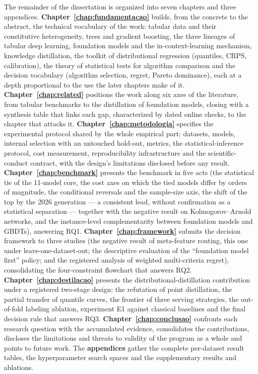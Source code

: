 The remainder of the dissertation is organized into seven chapters
and three appendices. \textbf{Chapter~\ref{chap:fundamentacao}}
builds, from the concrete to the abstract, the technical vocabulary
of the work: tabular data and their constitutive heterogeneity,
trees and gradient boosting, the three lineages of tabular deep
learning, foundation models and the in-context-learning mechanism,
knowledge distillation, the toolkit of distributional regression
(quantiles, CRPS, calibration), the theory of statistical tests for
algorithm comparison and the decision vocabulary (algorithm
selection, regret, Pareto dominance), each at a depth proportional
to the use the later chapters make of it.
\textbf{Chapter~\ref{chap:related}} positions the work along six
axes of the literature, from tabular benchmarks to the distillation
of foundation models, closing with a synthesis table that links each
gap, characterized by dated online checks, to the chapter that
attacks it. \textbf{Chapter~\ref{chap:metodologia}} specifies the
experimental protocol shared by the whole empirical part: datasets,
models, internal selection with an untouched hold-out, metrics, the
statistical-inference protocol, cost measurement, reproducibility
infrastructure and the scientific-conduct contract, with the
design's limitations disclosed before any result.
\textbf{Chapter~\ref{chap:benchmark}} presents the benchmark in five
acts (the statistical tie of the 11-model core, the cost axes on
which the tied models differ by orders of magnitude, the conditional
reversals and the sample-size axis, the shift of the top by the 2026
generation --- a consistent lead, without confirmation as a
statistical separation --- together with the negative result on
Kolmogorov--Arnold networks, and the instance-level complementarity
between foundation models and GBDTs), answering RQ1.
\textbf{Chapter~\ref{chap:framework}} submits the decision framework
to three studies (the negative result of meta-feature routing, this
one under leave-one-dataset-out; the descriptive evaluation of the
``foundation model first'' policy; and the registered analysis of
weighted multi-criteria regret), consolidating the four-constraint
flowchart that answers RQ2. \textbf{Chapter~\ref{chap:destilacao}}
presents the distributional-distillation contribution under a
registered two-stage design: the refutation of point distillation,
the partial transfer of quantile curves, the frontier of three
serving strategies, the out-of-fold labeling ablation, experiment E1
against classical baselines and the final decision rule that answers
RQ3. \textbf{Chapter~\ref{chap:conclusao}} confronts each research
question with the accumulated evidence, consolidates the
contributions, discloses the limitations and threats to validity of
the program as a whole and points to future work. The
\textbf{appendices} gather the complete per-dataset result tables,
the hyperparameter search spaces and the supplementary results and
ablations.
